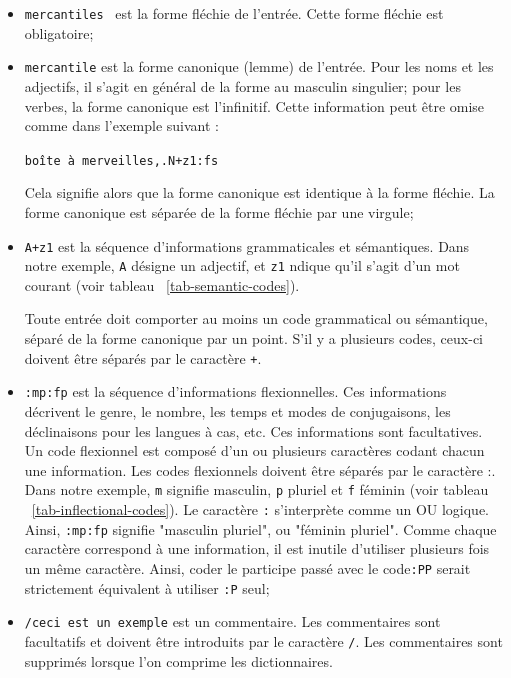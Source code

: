 \bigskip
\begin{itemize}
\item \verb+mercantiles + est la forme fléchie de l’entrée. Cette forme fléchie
est obligatoire;
  
\bigskip \item \verb+mercantile+ est la forme canonique (lemme) de l’entrée.
 Pour les noms et les adjectifs, il s’agit
en général de la forme au masculin singulier; pour les verbes, la forme canonique est
l’infinitif. Cette information peut être omise comme dans l’exemple suivant :

  
\bigskip
\verb$boîte à merveilles,.N+z1:fs$
  
\bigskip Cela signifie alors que la forme canonique est identique à la forme fléchie. La forme
canonique est séparée de la forme fléchie par une virgule;
\index{\verb+,+}
  
\bigskip \item \verb$A+z1$ est la séquence d’informations grammaticales et sémantiques.
 Dans notre exemple, \verb+A+
désigne un adjectif, et \verb+z1+ ndique qu’il s’agit d’un mot courant (voir tableau ~\ref{tab-semantic-codes}).

Toute entrée doit comporter au moins un code grammatical ou sémantique, séparé de
la forme canonique par un point. S’il y a plusieurs codes, ceux-ci doivent être séparés
par le caractère \verb$+$\index{\verb$+$}.
  
\bigskip
\item \verb+:mp:fp+ est la séquence d’informations flexionnelles.
 Ces informations décrivent le genre, le nombre, les temps et modes
de conjugaisons, les déclinaisons pour les langues à cas, etc. Ces informations sont facultatives.
Un code flexionnel est composé d’un ou plusieurs caractères codant chacun une information. Les codes
flexionnels doivent être séparés par le caractère :. Dans notre exemple, \verb+m+ signifie masculin,
\verb+p+ pluriel et \verb+f+ féminin (voir tableau ~\ref{tab-inflectional-codes}). Le caractère \verb+:+ s’interprète comme un OU logique. Ainsi, \verb+:mp:fp+ signifie "masculin pluriel", ou "féminin pluriel". Comme chaque caractère correspond à une information, il est inutile d’utiliser plusieurs fois un même caractère. Ainsi, coder le participe passé avec le code\verb+:PP+ serait strictement équivalent à utiliser \verb+:P+ seul;\index{\verb+:+}
  
\bigskip \item \verb+/ceci est un exemple+ est un commentaire. Les commentaires sont facultatifs et
doivent être introduits par le caractère \verb+/+. Les commentaires sont supprimés lorsque
l’on comprime les dictionnaires.  \index{\verb+/+}
\end{itemize}

